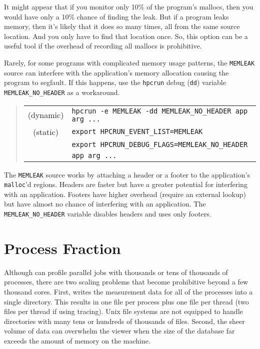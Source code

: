 It might appear that if you monitor only 10\% of the program's
mallocs, then you would have only a 10\% chance of finding the leak.
But if a program leaks memory, then it's likely that it does so many
times, all from the same source location.  And you only have to find
that location once.  So, this option can be a useful tool if the
overhead of recording all mallocs is prohibitive.

Rarely, for some programs with complicated memory usage patterns, the
\verb|MEMLEAK| source can interfere with the application's memory
allocation causing the program to segfault.  If this happens, use the
\verb|hpcrun| debug ({\tt dd}) variable \verb|MEMLEAK_NO_HEADER| as a
workaround.

\begin{quote}
\begin{tabular}{@{}cl}
(dynamic) & \verb|hpcrun -e MEMLEAK -dd MEMLEAK_NO_HEADER app arg ...| \\
(static)  & \verb|export HPCRUN_EVENT_LIST=MEMLEAK| \\
& \verb|export HPCRUN_DEBUG_FLAGS=MEMLEAK_NO_HEADER| \\
& \verb|app arg ...|
\end{tabular}
\end{quote}

The \verb|MEMLEAK| source works by attaching a header or a footer to
the application's \verb|malloc|'d regions.  Headers are faster but
have a greater potential for interfering with an application.  Footers
have higher overhead (require an external lookup) but have almost no
chance of interfering with an application.  The
\verb|MEMLEAK_NO_HEADER| variable disables headers and uses only
footers.


\section{Process Fraction}

Although \hpcrun{} can profile parallel jobs with thousands or tens of
thousands of processes, there are two scaling problems that become
prohibitive beyond a few thousand cores.  First, \hpcrun{} writes the
measurement data for all of the processes into a single directory.
This results in one file per process plus one file per thread (two
files per thread if using tracing).  Unix file systems are not
equipped to handle directories with many tens or hundreds of thousands
of files.  Second, the sheer volume of data can overwhelm the viewer
when the size of the database far exceeds the amount of memory on the
machine.

